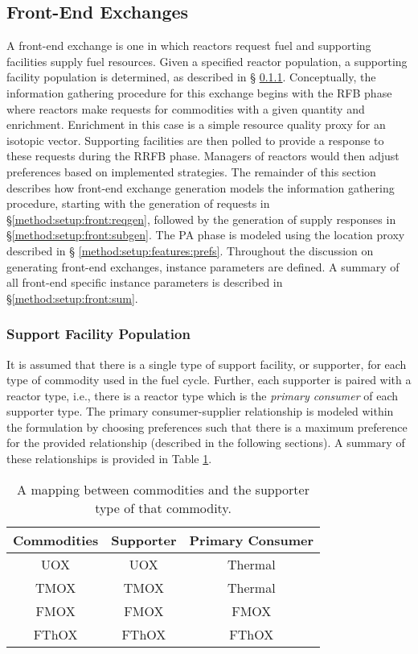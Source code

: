 \subsection{Front-End Exchanges}\label{method:setup:front}

A front-end exchange is one in which reactors request fuel and supporting
facilities supply fuel resources. Given a specified reactor population, a
supporting facility population is determined, as described in \S
\ref{method:setup:front:sup}. Conceptually, the information gathering procedure
for this exchange begins with the RFB phase where reactors make requests for
commodities with a given quantity and enrichment. Enrichment in this case is a
simple resource quality proxy for an isotopic vector. Supporting facilities are
then polled to provide a response to these requests during the RRFB
phase. Managers of reactors would then adjust preferences based on implemented
strategies. The remainder of this section describes how front-end exchange
generation models the information gathering procedure, starting with the
generation of requests in \S \ref{method:setup:front:reqgen}, followed by the
generation of supply responses in \S \ref{method:setup:front:subgen}. The PA
phase is modeled using the location proxy described in \S
\ref{method:setup:features:prefs}. Throughout the discussion on generating
front-end exchanges, instance parameters are defined. A summary of all front-end
specific instance parameters is described in \S \ref{method:setup:front:sum}.

\subsubsection{Support Facility Population} \label{method:setup:front:sup}

It is assumed that there is a single type of support facility, or supporter, for
each type of commodity used in the fuel cycle. Further, each supporter is paired
with a reactor type, i.e., there is a reactor type which is the \textit{primary
  consumer} of each supporter type. The primary consumer-supplier relationship
is modeled within the formulation by choosing preferences such that there is a
maximum preference for the provided relationship (described in the following
sections). A summary of these relationships is provided in Table
\ref{tbl:commod_to_sup}.

\begin{table}[h!]
\centering
\caption{A mapping between commodities and the supporter type of that commodity.}
\label{tbl:commod_to_sup}
\begin{tabular}{|c|c|c|}
\hline
\textbf{Commodities}            & \textbf{Supporter} & \textbf{Primary Consumer} \\ \hline
UOX                    & UOX  & Thermal       \\ \hline
TMOX                    & TMOX & Thermal        \\ \hline
FMOX                    & FMOX & FMOX        \\ \hline
FThOX                    & FThOX & FThOX        \\ \hline
\end{tabular}
\end{table}

